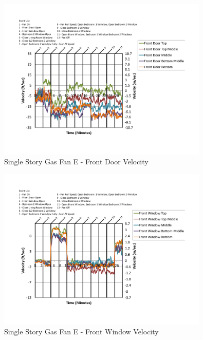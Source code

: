 \documentclass{article}
\begin{document}
\begin{appendices}
	\begin{figure}[H]
		\centering
		\includegraphics[height=3.05in,trim=0.67in 1.1in 0.67in 0.8in,clip=true]{0_Images/Results_Charts/ColdFlow/Single_Story/Gas/E/Front_Door_Velocity.pdf}
		\caption{Single Story Gas Fan E - Front Door Velocity}
	\end{figure}
 

	\begin{figure}[H]
		\centering
		\includegraphics[height=3.05in,trim=0.67in 1.1in 0.67in 0.8in,clip=true]{0_Images/Results_Charts/ColdFlow/Single_Story/Gas/E/Front_Window_Velocity.pdf}
		\caption{Single Story Gas Fan E - Front Window Velocity}
	\end{figure}
 
	\clearpage


\end{appendices}
\end{document}
